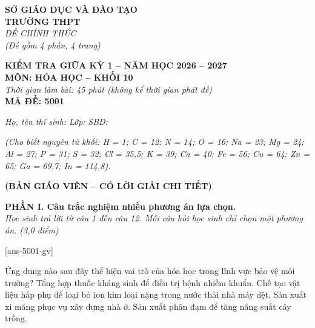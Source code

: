\documentclass[11pt,a4paper]{article}
\begin{document}
\begin{minipage}[t]{0.45\textwidth}
\textbf{SỞ GIÁO DỤC VÀ ĐÀO TẠO}\\
\textbf{TRƯỜNG THPT}\\
\textit{ĐỀ CHÍNH THỨC}\\
\textit{(Đề gồm 4 phần, 4 trang)}
\end{minipage}
\hfill
\begin{minipage}[t]{0.52\textwidth}
\raggedleft
\textbf{\color{hfRed}KIỂM TRA GIỮA KỲ 1 -- NĂM HỌC 2026 -- 2027}\\
\textbf{MÔN: HÓA HỌC -- KHỐI 10}\\
\textit{Thời gian làm bài: 45 phút (không kể thời gian phát đề)}\\
\textbf{MÃ ĐỀ: 5001}
\end{minipage}

\vspace{3pt}
\noindent
\textit{Họ, tên thí sinh:} \dotfill \textit{Lớp:} \dotfill \textit{SBD:} \dotfill

\vspace{2pt}
\noindent
\textit{\footnotesize (Cho biết nguyên tử khối: H = 1; C = 12; N = 14; O = 16; Na = 23; Mg = 24; Al = 27; P = 31; S = 32; Cl = 35,5; K = 39; Ca = 40; Fe = 56; Cu = 64; Zn = 65; Ga = 69,7; In = 114,8).}

\vspace{2pt}
\begin{center}
\textbf{\color{hfRed}\large (BẢN GIÁO VIÊN -- CÓ LỜI GIẢI CHI TIẾT)}
\end{center}

\vspace{2pt}
\noindent
\textbf{\color{mainGreen}PHẦN I. Câu trắc nghiệm nhiều phương án lựa chọn.}\\
\textit{Học sinh trả lời từ câu 1 đến câu 12. Mỗi câu hỏi học sinh chỉ chọn một phương án. (3,0 điểm)}

[ans-5001-gv]

\begin{ex}
Ứng dụng nào sau đây thể hiện vai trò của hóa học trong lĩnh vực bảo vệ môi trường?
\choice
{Tổng hợp thuốc kháng sinh để điều trị bệnh nhiễm khuẩn.}
{\True Chế tạo vật liệu hấp phụ để loại bỏ ion kim loại nặng trong nước thải nhà máy dệt.}
{Sản xuất xi măng phục vụ xây dựng nhà ở.}
{Sản xuất phân đạm để tăng năng suất cây trồng.}
\end{ex}
\end{document}

